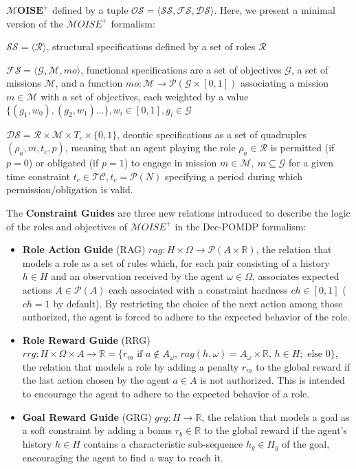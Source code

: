 \documentclass[sigconf,anonymous]{aamas}
\begin{document}
$\mathbf{\mathcal{M}OISE^+}$ \quad defined by a tuple $\mathcal{OS} = \langle \mathcal{SS}, \mathcal{FS}, \mathcal{DS} \rangle$. Here, we present a minimal version of the $\mathcal{M}OISE^+$ formalism:
\begin{itemize*}[label={},itemjoin={; }]
    \item $\mathcal{SS} = \langle \mathcal{R} \rangle$, structural specifications defined by a set of roles $\mathcal{R}$
    \item $\mathcal{FS} = \langle \mathcal{G}, \mathcal{M}, mo \rangle$, functional specifications are a set of objectives $\mathcal{G}$, a set of missions $\mathcal{M}$, and a function $mo: \mathcal{M} \to \mathcal{P}(\mathcal{G} \times [0,1])$ associating a mission $m \in \mathcal{M}$ with a set of objectives, each weighted by a value $\{(g_1,w_0), (g_2,w_1)\dots\}, w_i \in [0,1], g_i \in \mathcal{G}$
    \item $\mathcal{DS} = \mathcal{R} \times \mathcal{M} \times T_c \times \{0,1\}$, deontic specifications as a set of quadruples $(\rho_a, m, \allowbreak t_c, p)$, meaning that an agent playing the role $\rho_a \in \mathcal{R}$ is permitted (if $p = 0$) or obligated (if $p = 1$) to engage in mission $m \in \mathcal{M}, \ m \subseteq \mathcal{G}$ for a given time constraint $t_c \in \mathcal{TC}, t_c = \mathcal{P}(N)$ specifying a period during which permission/obligation is valid.
\end{itemize*}

The \textbf{Constraint Guides} \quad are three new relations introduced to describe the logic of the roles and objectives of $\mathcal{M}OISE^+$ in the Dec-POMDP formalism:

\begin{itemize}
    \item \textbf{Role Action Guide} (RAG) \quad $rag: H \times \Omega \rightarrow \mathcal{P}(A \times \mathbb{R})$, the relation that models a role as a set of rules which, for each pair consisting of a history $h \in H$ and an observation received by the agent $\omega \in \Omega$, associates expected actions $A \in \mathcal{P}(A)$ each associated with a constraint hardness $ch \in [0,1]$ ($ch = 1$ by default). By restricting the choice of the next action among those authorized, the agent is forced to adhere to the expected behavior of the role.
    \item \textbf{Role Reward Guide} (RRG) \quad $rrg: H \times \Omega \times A \to \mathbb{R} = \{r_m \text{ if } a \notin A_\omega \text{, } rag(h, \omega) = A_\omega \times \mathbb{R} \text{, } h \in H; \text{ else } 0\}$, the relation that models a role by adding a penalty $r_m$ to the global reward if the last action chosen by the agent $a \in A$ is not authorized. This is intended to encourage the agent to adhere to the expected behavior of a role.
    \item \textbf{Goal Reward Guide} (GRG) \quad $grg: H \rightarrow \mathbb{R}$, the relation that models a goal as a soft constraint by adding a bonus $r_b \in \mathbb{R}$ to the global reward if the agent's history $h \in H$ contains a characteristic sub-sequence $h_g \in H_g$ of the goal, encouraging the agent to find a way to reach it.
\end{itemize}
\end{document}
